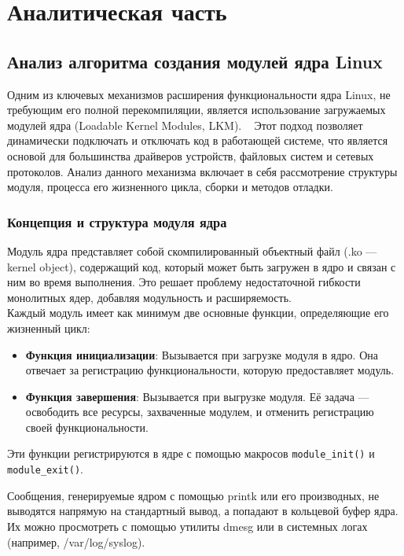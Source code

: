 \section{Аналитическая часть}

\subsection{Анализ алгоритма создания модулей ядра Linux}

Одним из ключевых механизмов расширения функциональности ядра Linux, не требующим его полной перекомпиляции, является использование загружаемых модулей ядра (Loadable Kernel Modules, LKM). ~\cite{kernel_modules_doc}
Этот подход позволяет динамически подключать и отключать код в работающей системе, что является основой для большинства драйверов устройств, файловых систем и сетевых протоколов.
Анализ данного механизма включает в себя рассмотрение структуры модуля, процесса его жизненного цикла, сборки и методов отладки.

\subsubsection{Концепция и структура модуля ядра}

Модуль ядра представляет собой скомпилированный объектный файл (.ko — kernel object), содержащий код, который может быть загружен в ядро и связан с ним во время выполнения.
Это решает проблему недостаточной гибкости монолитных ядер, добавляя модульность и расширяемость.\\

Каждый модуль имеет как минимум две основные функции, определяющие его жизненный цикл:
\begin{itemize}
    \item \textbf{Функция инициализации}: Вызывается при загрузке модуля в ядро.
    Она отвечает за регистрацию функциональности, которую предоставляет модуль.
    \item \textbf{Функция завершения}: Вызывается при выгрузке модуля.
    Её задача — освободить все ресурсы, захваченные модулем, и отменить регистрацию своей функциональности.
\end{itemize}

Эти функции регистрируются в ядре с помощью макросов \texttt{module_init()} и \texttt{module_exit()}.



Сообщения, генерируемые ядром с помощью printk или его производных, не выводятся напрямую на стандартный вывод, а попадают в кольцевой буфер ядра.
Их можно просмотреть с помощью утилиты dmesg или в системных логах (например, /var/log/syslog).

